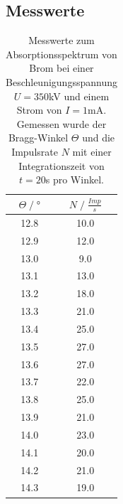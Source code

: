 \subsection{Messwerte}
\begin{table}[H]
    \centering
    \begin{tabular}{c c}
        \toprule
        $\Theta\;/\;°$& $N\;/\;\frac{Imp}{s}$\\
        \midrule
        12.8&	10.0\\
        12.9&	12.0\\
        13.0&	9.0\\
        13.1&	13.0\\
        13.2&	18.0\\
        13.3&	21.0\\
        13.4&	25.0\\
        13.5&	27.0\\
        13.6&	27.0\\
        13.7&	22.0\\
        13.8&	25.0\\
        13.9&	21.0\\
        14.0&	23.0\\
        14.1&	20.0\\
        14.2&	21.0\\
        14.3&	19.0\\
        \bottomrule
    \end{tabular}
    \caption{Messwerte zum Absorptionsspektrum von Brom bei einer Beschleunigungsspannung 
    $U=350$kV und einem Strom von $I=1$mA.\\
    Gemessen wurde der Bragg-Winkel $\Theta$ und die Impulsrate $N$ mit einer Integrationszeit
    von $t=20$s pro Winkel.}
\end{table}
